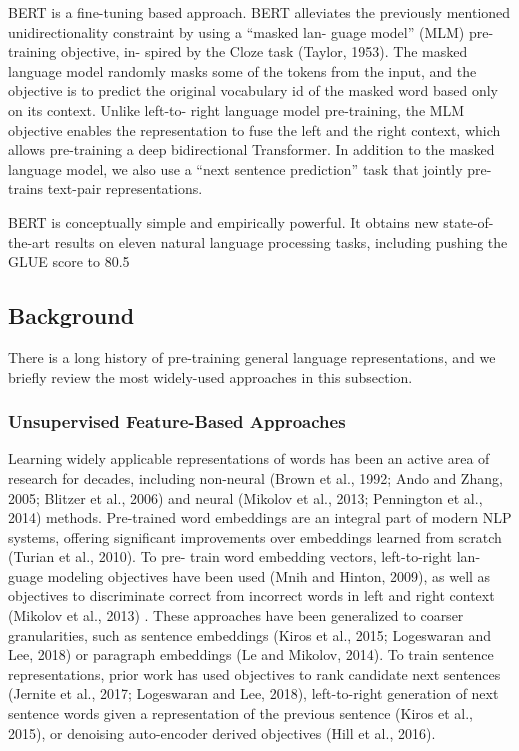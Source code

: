 \documentclass{report}
\begin{document}
BERT is a fine-tuning based approach. BERT alleviates the previously mentioned unidirectionality constraint by using a “masked lan- guage model” (MLM) pre-training objective, in- spired by the Cloze task (Taylor, 1953). The masked language model randomly masks some of the tokens from the input, and the objective is to predict the original vocabulary id of the masked word based only on its context. Unlike left-to- right language model pre-training, the MLM objective enables the representation to fuse the left and the right context, which allows pre-training a deep bidirectional Transformer. In addition to the masked language model, we also use a “next sentence prediction” task that jointly pre-trains text-pair representations. 

BERT is conceptually simple and empirically powerful. It obtains new state-of-the-art results on eleven natural language processing tasks, including pushing the GLUE score to 80.5%

\subsection{Background}
\label{ssec:bert-background}
There is a long history of pre-training general language representations, and we briefly review the most widely-used approaches in this subsection.

\subsubsection{Unsupervised Feature-Based Approaches}
\label{sssec:bert-unsupervised-feature-based-approaches}
Learning widely applicable representations of words has been an active area of research for decades, including non-neural (Brown et al., 1992; Ando and Zhang, 2005; Blitzer et al., 2006) and neural (Mikolov et al., 2013; Pennington et al., 2014) methods. Pre-trained word embeddings are an integral part of modern NLP systems, offering significant improvements over embeddings learned from scratch (Turian et al., 2010). To pre- train word embedding vectors, left-to-right lan- guage modeling objectives have been used (Mnih and Hinton, 2009), as well as objectives to discriminate correct from incorrect words in left and right context (Mikolov et al., 2013) .
These approaches have been generalized to coarser granularities, such as sentence embeddings (Kiros et al., 2015; Logeswaran and Lee, 2018) or paragraph embeddings (Le and Mikolov, 2014). To train sentence representations, prior work has used objectives to rank candidate next sentences (Jernite et al., 2017; Logeswaran and Lee, 2018), left-to-right generation of next sentence words given a representation of the previous sentence (Kiros et al., 2015), or denoising auto-encoder derived objectives (Hill et al., 2016).
\end{document}
